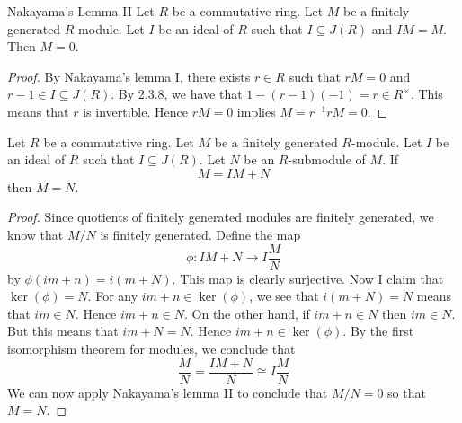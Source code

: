 \documentclass[a4paper]{article}
\begin{document}
\begin{lmm}{Nakayama's Lemma II}{} Let $R$ be a commutative ring. Let $M$ be a finitely generated $R$-module. Let $I$ be an ideal of $R$ such that $I\subseteq J(R)$ and $IM=M$. Then $M=0$. \tcbline
\begin{proof}
By Nakayama's lemma I, there exists $r\in R$ such that $rM=0$ and $r-1\in I\subseteq J(R)$. By 2.3.8, we have that $1-(r-1)(-1)=r\in R^\times$. This means that $r$ is invertible. Hence $rM=0$ implies $M=r^{-1}rM=0$. 
\end{proof}
\end{lmm}

\begin{crl}{}{} Let $R$ be a commutative ring. Let $M$ be a finitely generated $R$-module. Let $I$ be an ideal of $R$ such that $I\subseteq J(R)$. Let $N$ be an $R$-submodule of $M$. If $$M=IM+N$$ then $M=N$. \tcbline
\begin{proof}
Since quotients of finitely generated modules are finitely generated, we know that $M/N$ is finitely generated. Define the map $$\phi:IM+N\to I\frac{M}{N}$$ by $\phi(im+n)=i(m+N)$. This map is clearly surjective. Now I claim that $\ker(\phi)=N$. For any $im+n\in\ker(\phi)$, we see that $i(m+N)=N$ means that $im\in N$. Hence $im+n\in N$. On the other hand, if $im+n\in N$ then $im\in N$. But this means that $im+N=N$. Hence $im+n\in\ker(\phi)$. By the first isomorphism theorem for modules, we conclude that $$\frac{M}{N}=\frac{IM+N}{N}\cong I\frac{M}{N}$$ We can now apply Nakayama's lemma II to conclude that $M/N=0$ so that $M=N$. 
\end{proof}
\end{crl}
\end{document}
